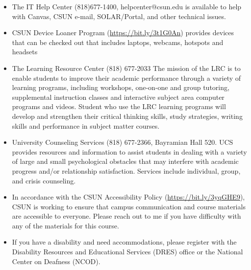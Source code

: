 \documentclass[
  letterpaper,
  DIV=11,
  numbers=noendperiod]{scrartcl}
\providecommand{\tightlist}{%
  \setlength{\itemsep}{0pt}\setlength{\parskip}{0pt}}\usepackage{longtable,booktabs,array}
\begin{document}
\begin{itemize}
\tightlist
\item
  The IT Help Center (818)677-1400, helpcenter@csun.edu is available to
  help with Canvas, CSUN e-mail, SOLAR/Portal, and other technical
  issues.
\item
  CSUN Device Loaner Program (\url{https://bit.ly/3t1G0An}) provides
  devices that can be checked out that includes laptops, webcams,
  hotspots and headsets
\item
  The Learning Resource Center (818) 677-2033 The mission of the LRC is
  to enable students to improve their academic performance through a
  variety of learning programs, including workshops, one-on-one and
  group tutoring, supplemental instruction classes and interactive
  subject area computer programs and videos. Student who use the LRC
  learning programs will develop and strengthen their critical thinking
  skills, study strategies, writing skills and performance in subject
  matter courses.
\item
  University Counseling Services (818) 677-2366, Bayramian Hall 520. UCS
  provides resources and information to assist students in dealing with
  a variety of large and small psychological obstacles that may
  interfere with academic progress and/or relationship satisfaction.
  Services include individual, group, and crisis counseling.
\item
  In accordance with the CSUN Accessibility Policy
  (\url{https://bit.ly/3yqGHE9}), CSUN is working to ensure that campus
  communication and course materials are accessible to everyone. Please
  reach out to me if you have difficulty with any of the materials for
  this course.
\item
  If you have a disability and need accommodations, please register with
  the Disability Resources and Educational Services (DRES) office or the
  National Center on Deafness (NCOD).


\end{itemize}
\end{document}
